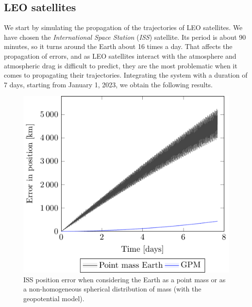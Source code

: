 \documentclass[../main.tex]{subfiles}
\begin{document}
\subsection{LEO satellites}
We start by simulating the propagation of the trajectories of LEO satellites. We have chosen the \emph{International Space Station} (\emph{ISS}) satellite. Its period is about 90 minutes, so it turns around the Earth about 16 times a day. That affects the propagation of errors, and as LEO satellites interact with the atmosphere and atmospheric drag is difficult to predict, they are the most problematic when it comes to propagating their trajectories. Integrating the system with a duration of 7 days, starting from January 1, 2023, we obtain the following results.
\begin{figure}[htbp]
  \centering
  \begin{minipage}[ht]{0.45\textwidth}
    \centering
    \includegraphics[width=\textwidth]{Images/simulation/ISS_pointMass_comparison.pdf}
    \caption{ISS position error when considering the Earth as a point mass or as a non-homogeneous spherical distribution of mass (with the geopotential model).}
    \label{fig:ISS_point}
  \end{minipage}
  \hspace{0.0333333\textwidth}
  \begin{minipage}[ht]{0.45\textwidth}
    \centering

\end{minipage}
\end{figure}
\end{document}

